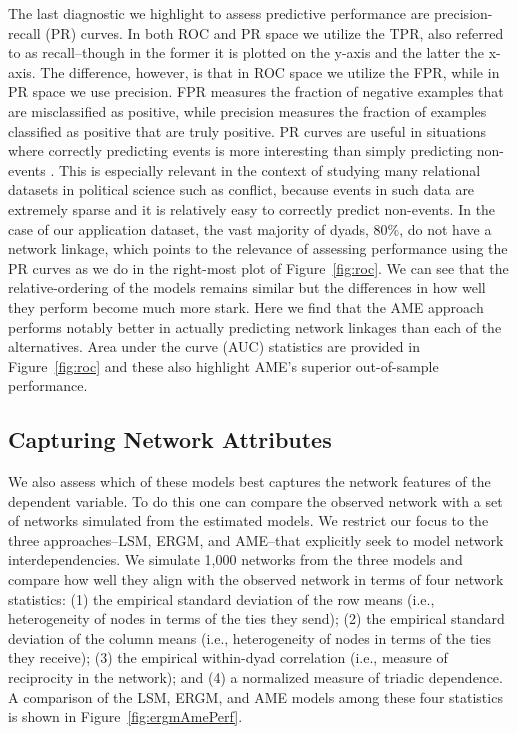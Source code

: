 \documentclass[9pt,twocolumn,twoside,lineno]{pnas-new}
\begin{document}
The last diagnostic we highlight to assess predictive performance are precision-recall (PR) curves. In both ROC and PR space we utilize the TPR, also referred to as recall--though in the former it is plotted on the y-axis and the latter the x-axis. The difference, however, is that in ROC space we utilize the FPR, while in PR space we use precision. FPR measures the fraction of negative examples that are misclassified as positive, while precision measures the fraction of examples classified as positive that are truly positive. PR curves are useful in situations where correctly predicting events is more interesting than simply predicting non-events \citep{davis:goadrich:2006}. This is especially relevant in the context of studying many relational datasets in political science such as conflict, because events in such data are extremely sparse and it is relatively easy to correctly predict non-events. In the case of our application dataset, the vast majority of dyads, 80\%, do not have a network linkage, which points to the relevance of assessing performance using the PR curves as we do in the right-most plot of Figure~\ref{fig:roc}. We can see that the relative-ordering of the models remains similar but the differences in how well they perform become much more stark. Here we find that the AME approach performs notably better in actually predicting network linkages than each of the alternatives. Area under the curve (AUC) statistics are provided in Figure~\ref{fig:roc} and these also highlight AME's superior out-of-sample performance.

\subsection*{Capturing Network Attributes}

We also assess which of these models best captures the network features of the dependent variable. To do this one can compare the observed network with a set of networks simulated from the estimated models. We restrict our focus to the three approaches--LSM, ERGM, and AME--that explicitly seek to model network interdependencies. We simulate 1,000 networks from the three models and compare how well they align with the observed network in terms of four network statistics: (1) the empirical standard deviation of the row means (i.e., heterogeneity of nodes in terms of the ties they send); (2) the empirical standard deviation of the column means (i.e., heterogeneity of nodes in terms of the ties they receive); (3) the empirical within-dyad correlation (i.e., measure of reciprocity in the network); and (4) a normalized measure of triadic dependence. A comparison of the LSM, ERGM, and AME models among these four statistics is shown in Figure~\ref{fig:ergmAmePerf}.
\end{document}
